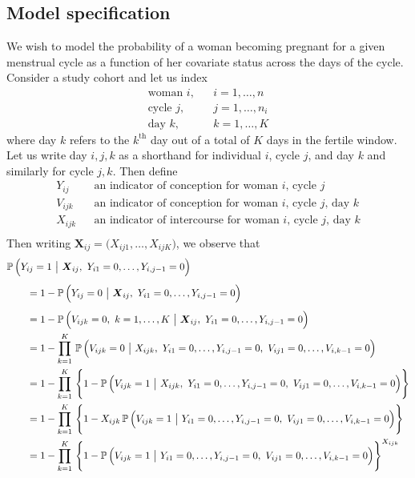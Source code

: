 \documentclass[11pt]{article}
\newcommand{\prob}{\mathbb{P}\,}
\renewcommand{\vec}{\boldsymbol}
\newcommand{\barM}{~\big|~}
\begin{document}
\subsection{Model specification}
We wish to model the probability of a woman becoming pregnant for a given menstrual cycle as a function of her covariate status across the days of the cycle.  Consider a study cohort and let us index
\[ \begin{array}{lll}
\text{woman } i, & & i = 1,\dots,n   \\[1ex]
\text{cycle } j, & & j = 1,\dots,n_i \\[1ex]
\text{day }   k, & & k = 1,\dots,K
\end{array} \]
where day $k$ refers to the $k^\text{th}$ day out of a total of $K$ days in the fertile window.  Let us write day $i,j,k$ as a shorthand for individual $i$, cycle $j$, and day $k$ and similarly for cycle $j,k$.  Then define
\[ \begin{array}{lll}
Y_{ij} & & \text{an indicator of conception for woman $i$, cycle $j$} \\[1ex]
V_{ijk} & & \text{an indicator of conception for woman $i$, cycle $j$, day $k$} \\[1ex]
X_{ijk} & & \text{an indicator of intercourse for woman $i$, cycle $j$, day $k$} \\[1ex]
\end{array}  \]
Then writing $\vec{X}_{ij} = \big( X_{ij1}, \dots, X_{ijK} \big)$, we observe that
\begin{align*} \MoveEqLeft
\prob\Big( Y_{ij} = 1 \barM \vec{X}_{ij},~ Y_{i1} = 0,\dots, Y_{i,j-1} = 0  \Big) \\[1ex]
&= 1 - \prob\Big( Y_{ij} = 0 \barM \vec{X}_{ij},~ Y_{i1} = 0,\dots, Y_{i,j-1} = 0 \Big) \\[1ex]
&= 1 - \prob\Big( V_{ijk} = 0,~ k=1,\dots,K \barM \vec{X}_{ij},~ Y_{i1} = 0,\dots, Y_{i,j-1} = 0 \Big) \\
&= 1 - \prod_{k=1}^K\, \prob\Big( V_{ijk} = 0 \barM X_{ijk},~ Y_{i1} = 0,\dots, Y_{i,j-1} = 0,~ V_{ij1} = 0, \dots, V_{i,k-1} = 0 \Big) \\
&= 1 - \prod_{k=1}^K\, \Bigg\{ 1 - \prob\Big( V_{ijk} = 1 \barM X_{ijk},~ Y_{i1} = 0,\dots, Y_{i,j-1} = 0,~ V_{ij1} = 0, \dots, V_{i,k-1} = 0 \Big) \Bigg\} \\
&= 1 - \prod_{k=1}^K\, \Bigg\{ 1 - X_{ijk}\, \prob\Big( V_{ijk} = 1 \barM Y_{i1} = 0,\dots, Y_{i,j-1} = 0,~ V_{ij1} = 0, \dots, V_{i,k-1} = 0 \Big) \Bigg\} \\
&= 1 - \prod_{k=1}^K\, \Bigg\{ 1 - \prob\Big( V_{ijk} = 1 \barM Y_{i1} = 0,\dots, Y_{i,j-1} = 0,~ V_{ij1} = 0, \dots, V_{i,k-1} = 0 \Big) \Bigg\}^{X_{ijk}} \\
\end{align*}
\end{document}
